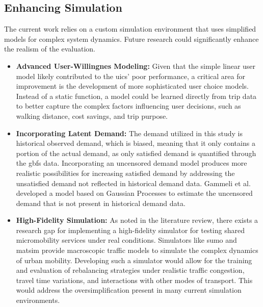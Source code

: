 \subsection{Enhancing Simulation}
The current work relies on a custom simulation environment that uses simplified models for complex system dynamics.
Future research could significantly enhance the realism of the evaluation.
\begin{itemize}
    \item \textbf{Advanced User-Willingnes Modeling:}
        Given that the simple linear user model likely contributed to the \glspl{uic}' poor performance, a critical area for improvement is the development of more sophisticated user choice models.
        Instead of a static function, a model could be learned directly from trip data to better capture the complex factors influencing user decisions, such as walking distance, cost savings, and trip purpose.
    \item \textbf{Incorporating Latent Demand:}
        The demand utilized in this study is historical observed demand, which is biased, meaning that it only contains a portion of the actual demand, as only satisfied demand is quantified through the \gls{gbfs} data.
        Incorporating an uncensored demand model produces more realistic possibilities for increasing satisfied demand by addressing the unsatisfied demand not reflected in historical demand data.
        Gammeli et al. \cite{gammelli_estimating_2020} developed a model based on Gaussian Processes to estimate the uncensored demand that is not present in historical demand data.
    \item \textbf{High-Fidelity Simulation:}
        As noted in the literature review, there exists a research gap for implementing a high-fidelity simulator for testing shared micromobility services under real conditions.
        Simulators like \gls{sumo} \cite{alvarez_lopez_simulation_2025} and \gls{matsim} \cite{horni_introducing_2016} provide macroscopic traffic models to simulate the complex dynamics of urban mobility.
        Developing such a simulator would allow for the training and evaluation of rebalancing strategies under realistic traffic congestion, travel time variations, and interactions with other modes of transport.
        This would address the oversimplification present in many current simulation environments.
\end{itemize}

